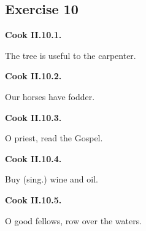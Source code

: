 \subsection*{Exercise 10}

\par\begin{minipage}{\linewidth}\raggedright
\textbf{Cook II.10.1.}

The tree is useful to the carpenter.

\end{minipage}\par\addvspace{4pt}

\par\begin{minipage}{\linewidth}\raggedright
\textbf{Cook II.10.2.}

Our horses have fodder.

\end{minipage}\par\addvspace{4pt}

\par\begin{minipage}{\linewidth}\raggedright
\textbf{Cook II.10.3.}

O priest, read the Gospel.

\end{minipage}\par\addvspace{4pt}

\par\begin{minipage}{\linewidth}\raggedright
\textbf{Cook II.10.4.}

Buy (sing.) wine and oil.

\end{minipage}\par\addvspace{4pt}

\par\begin{minipage}{\linewidth}\raggedright
\textbf{Cook II.10.5.}

O good fellows, row over the waters.

\end{minipage}\par\addvspace{4pt}

